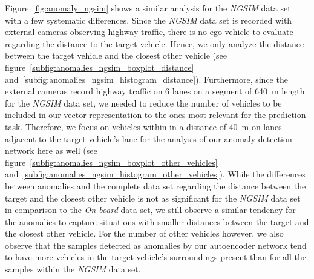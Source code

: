 Figure~\ref{fig:anomaly_ngsim} shows a similar analysis for the \emph{\ac{NGSIM}} data set with a few systematic differences.
Since the \emph{\ac{NGSIM}} data set is recorded with external cameras observing highway traffic, there is no ego-vehicle to evaluate regarding the distance to the target vehicle.
Hence, we only analyze the distance between the target vehicle and the closest other vehicle (see figure~\ref{subfig:anomalies_ngsim_boxplot_distance} and~\ref{subfig:anomalies_ngsim_histogram_distance}).
Furthermore, since the external cameras record highway traffic on \num{6} lanes on a segment of \SI{640}{\meter} length for the \emph{\ac{NGSIM}} data set, we needed to reduce the number of vehicles to be included in our vector representation to the ones most relevant for the prediction task.
Therefore, we focus on vehicles within in a distance of \SI{40}{\meter} on lanes adjacent to the target vehicle's lane for the analysis of our anomaly detection network here as well (see figure~\ref{subfig:anomalies_ngsim_boxplot_other_vehicles} and~\ref{subfig:anomalies_ngsim_histogram_other_vehicles}).
While the differences between anomalies and the complete data set regarding the distance between the target and the closest other vehicle is not as significant for the \emph{\ac{NGSIM}} data set in comparison to the \emph{On-board} data set, we still observe a similar tendency for the anomalies to capture situations with smaller distances between the target and the closest other vehicle.
For the number of other vehicles however, we also observe that the samples detected as anomalies by our autoencoder network tend to have more vehicles in the target vehicle's surroundings present than for all the samples within the \emph{\ac{NGSIM}} data set.

